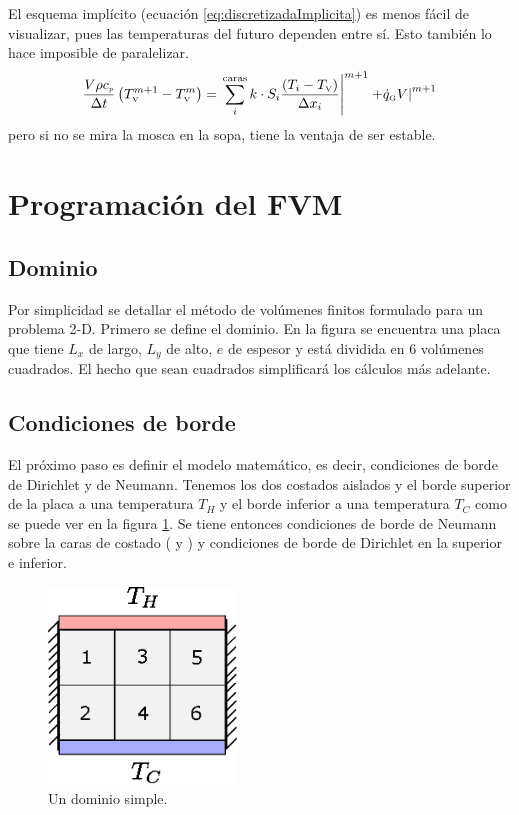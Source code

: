 \documentclass[11pt, titlepage]{article}
\begin{document}
El esquema implícito (ecuación \ref{eq:discretizadaImplicita}) es menos fácil de visualizar, pues las temperaturas del futuro dependen entre sí. Esto también lo hace imposible de paralelizar.
\begin{equation} \label{eq:discretizadaImplicita}
    \frac{V\rho {c_{\textit{\tiny p}}}}{\Delta t}\left(T_{\text{\tiny V}}^{m+1}-T_{\text{\tiny V}}^{m} \right) = \left.\sum_i^{\text{caras}} k\cdot S_i\frac{(T_i-T_{\text{\tiny V}})}{\Delta x_i}\right|^{m+1} +\!\! \left. {\dot{q}_{\text{\tiny G}}} V \right|^{m+1}
\end{equation}
pero si no se mira la mosca en la sopa, tiene la ventaja de ser estable.

\section{Programación del FVM}
\subsection{Dominio}
Por simplicidad se detallar el método de volúmenes finitos formulado para un problema 2-D. Primero se define el dominio. En la figura se encuentra una placa que tiene $L_x$ de largo, $L_y$ de alto, $e$ de espesor y está dividida en 6 volúmenes cuadrados. El hecho que sean cuadrados simplificará los cálculos más adelante.
\subsection{Condiciones de borde}
El próximo paso es definir el modelo matemático, es decir, condiciones de borde de Dirichlet y de Neumann. Tenemos los dos costados aislados y el borde superior de la placa a una temperatura $T_H$ y el borde inferior a una temperatura $T_C$ como se puede ver en la figura \ref{fig:simpleDomain}. Se tiene entonces condiciones de borde de Neumann sobre la caras de costado (\east{} y \west{}) y condiciones de borde de Dirichlet en la superior e inferior.


\begin{figure}[htb!]
    \centering
    \includegraphics[width=5cm]{fig/simpleDomain.eps}
    \caption{Un dominio simple.}
    \label{fig:simpleDomain}
\end{figure}
\end{document}

